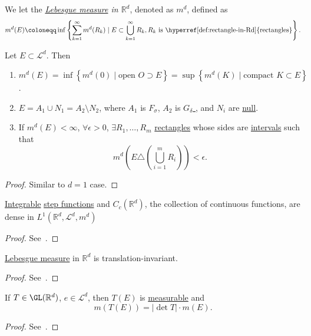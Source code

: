 \begin{definition}
	We let the \emph{\hyperref[def:Lebesgue-measure]{Lebesgue measure} in \(\mathbb{R} ^d\)}, denoted as \(m^d\), defined as
	\[
		m^d(E) \coloneqq \inf \left\{\sum_{k=1}^{\infty} m^d(R_{k} )\mid E\subset \bigcup_{k=1}^{\infty} R_{k} , R_{k} \text{ is \hyperref[def:rectangle-in-Rd]{rectangles}}\right\}.
	\]
\end{definition}
\begin{theorem}\label{thm:lec-20}
	Let \(E\subset \mathcal{L} ^d\). Then
	\begin{enumerate}[(1)]
		\item \(m^d(E) = \inf \left\{m^d (0) \mid \text{open } O\supset E \right\} = \sup \left\{m^d (K)\mid \text{compact }K\subset E \right\}\).
		\item \(E = A_1 \cup N_1 = A_2 \setminus N_2\), where \(A_1\) is \hyperref[def:F-sigma-set]{\(F_\sigma \)}, \(A_2\) is \hyperref[def:G-delta-set]{\(G_\delta \) }, and \(N_{i} \) are \hyperref[def:mu-null-set]{null}.
		\item If \(m^d(E)<\infty \), \(\forall \epsilon >0\), \(\exists R_1, \dots , R_m \) \hyperref[def:rectangle-in-Rd]{rectangles} whose sides are \underline{intervals} such that
		      \[
			      m^d \left(E\triangle \left(\bigcup_{i=1}^{m} R_{i} \right)\right)< \epsilon .
		      \]
	\end{enumerate}
\end{theorem}
\begin{proof}
	Similar to \(d = 1\) case.
\end{proof}

\begin{theorem}
	\hyperref[def:integrable]{Integrable} \hyperref[def:step-function]{step functions} and \(C_c(\mathbb{R} ^d)\), the collection
	of continuous functions, are dense in \(L^1(\mathbb{R} ^d, \mathcal{L} ^d, m^d)\)
\end{theorem}
\begin{proof}
	See~\cite{folland1999real}.
\end{proof}

\begin{theorem}
	\hyperref[def:Lebesgue-measure]{Lebesgue measure} in \(\mathbb{R} ^d\) is translation-invariant.
\end{theorem}
\begin{proof}
	See~\cite{folland1999real}.
\end{proof}

\begin{theorem}\label{thm:effect-of-linear-transformation-on-Lebesgue-measure}
	If \(T\in \GL (\mathbb{R} ^d)\), \(e\in \mathcal{L} ^d\), then \(T(E)\) is \hyperref[def:measurable-function]{measurable} and
	\[
		m(T(E)) = \left\vert \det T \right\vert \cdot m(E).
	\]
\end{theorem}
\begin{proof}
	See~\cite{folland1999real}.
\end{proof}

